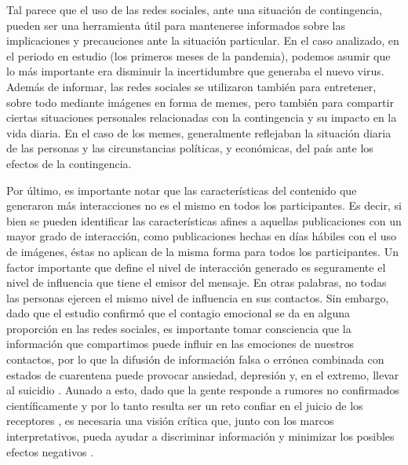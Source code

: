 \documentclass{textolivre}
\begin{document}
Tal parece que el uso de las redes sociales, ante una situación de contingencia, pueden ser una herramienta útil para mantenerse informados sobre las implicaciones y precauciones ante la situación particular. En el caso analizado, en el periodo en estudio (los primeros meses de la pandemia), podemos asumir que lo más importante era disminuir la incertidumbre que generaba el nuevo virus. Además de informar, las redes sociales se utilizaron también para entretener, sobre todo mediante imágenes en forma de memes, pero también para compartir ciertas situaciones personales relacionadas con la contingencia y su impacto en la vida diaria. En el caso de los memes, generalmente reflejaban la situación diaria de las personas y las circunstancias políticas, y económicas, del país ante los efectos de la contingencia. 

Por último, es importante notar que las características del contenido que generaron más interacciones no es el mismo en todos los participantes. Es decir, si bien se pueden identificar las características afines a aquellas publicaciones con un mayor grado de interacción, como publicaciones hechas en días hábiles con el uso de imágenes, éstas no aplican de la misma forma para todos los participantes. Un factor importante que define el nivel de interacción generado es seguramente el nivel de influencia que tiene el emisor del mensaje. En otras palabras, no todas las personas ejercen el mismo nivel de influencia en sus contactos. Sin embargo, dado que el estudio confirmó que el contagio emocional se da en alguna proporción en las redes sociales, es importante tomar consciencia que la información que compartimos puede influir en las emociones de nuestros contactos, por lo que la difusión de información falsa o errónea combinada con estados de cuarentena puede provocar ansiedad, depresión y, en el extremo, llevar al suicidio \cite{gonzlezPadilla2020}. Aunado a esto, dado que la gente responde a rumores no confirmados científicamente y por lo tanto resulta ser un reto confiar en el juicio de los receptores \cite{cato2021,wheaton2021,prikhidko2020}, es necesaria una visión crítica que, junto con los marcos interpretativos, pueda ayudar a discriminar información y minimizar los posibles efectos negativos \cite{salazar2018}. 
\end{document}

